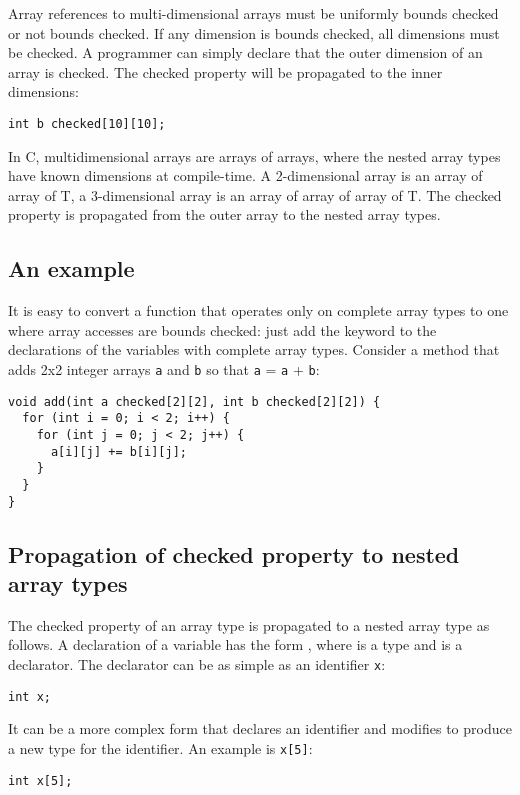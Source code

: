 Array references to multi-dimensional arrays must be uniformly bounds
checked or not bounds checked. If any dimension is bounds checked, all
dimensions must be checked. A programmer can simply declare that
the outer dimension of an array is checked.  The checked property will be 
propagated to the inner dimensions:

\begin{lstlisting}
int b checked[10][10];
\end{lstlisting}

In C, multidimensional arrays are arrays of arrays,
where the nested array types have known dimensions at compile-time. A
2-dimensional array is an array of array of T, a 3-dimensional array is
an array of array of array of T. The checked property is propagated from the
outer array to the nested array types.

\subsection{An example}

It is easy to convert a function that operates only on complete array
types to one where array accesses are bounds checked: just add the
 keyword to the declarations of the variables with complete array
types. Consider a method that adds 2x2 integer arrays \lstinline+a+ and
\lstinline+b+ so that \lstinline+a+ = \lstinline+a+ + \lstinline+b+:

\begin{lstlisting}
void add(int a checked[2][2], int b checked[2][2]) {
  for (int i = 0; i < 2; i++) {
    for (int j = 0; j < 2; j++) {
      a[i][j] += b[i][j];
    }
  }
}
\end{lstlisting}

\subsection{Propagation of checked property to nested array types}
The checked property of an array type is propagated to a nested array type as follows.
A declaration of a variable has the form  ,
where  is a type and  is a declarator. The declarator
can be as simple as an identifier \lstinline+x+:
\begin{lstlisting}
int x;
\end{lstlisting}
It can be a more complex form that declares an identifier and modifies 
to produce a new type for the identifier. An example is \lstinline+x[5]+:
\begin{lstlisting}
int x[5];
\end{lstlisting}

